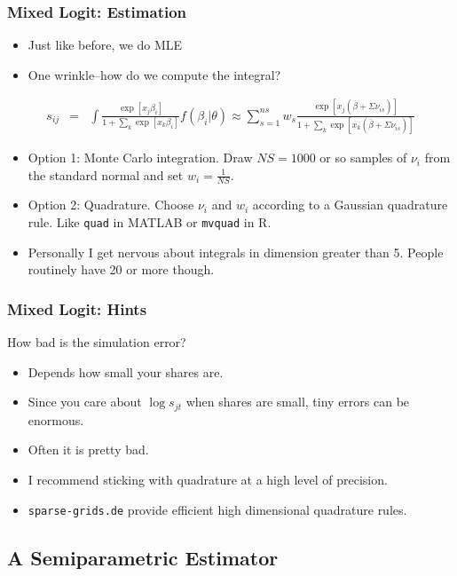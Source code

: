 \documentclass[xcolor=pdftex,dvipsnames,table,mathserif,aspectratio=169]{beamer}
\begin{document}
\begin{frame}
\frametitle{Mixed Logit: Estimation}
 \begin{itemize}
\item Just like before, we do MLE
\item One wrinkle--how do we compute the integral?
 \end{itemize}
\begin{eqnarray*}
s_{ij} &=& \int \frac{\exp[x_{j} \beta_i  ]}{1+\sum_k \exp[x_{k} \beta_i  ]} f(\beta_i | \theta) \approx \sum_{s=1}^{ns} w_s \frac{\exp[x_{j} (\overline{\beta} + \Sigma \nu_{is})  ]}{1+\sum_k \exp[x_{k} (\overline{\beta} + \Sigma \nu_{is})  ]} 
\end{eqnarray*}
 \begin{itemize}
\item Option 1: Monte Carlo integration.  Draw $NS=1000$ or so samples of $\nu_i$ from the standard normal and set $w_i = \frac{1}{NS}$.
\item Option 2: Quadrature. Choose $\nu_i$ and $w_i$ according to a Gaussian quadrature rule. Like \texttt{quad} in MATLAB or \texttt{mvquad} in R.
\item Personally I get nervous about integrals in dimension greater than 5. People routinely have 20 or more though.
 \end{itemize}
\end{frame}

\begin{frame}
\frametitle{Mixed Logit: Hints}
 How bad is the simulation error?
 \begin{itemize}
\item Depends how small your shares are. 
\item Since you care about $\log s_{jt}$ when shares are small, tiny errors can be enormous.
\item Often it is pretty bad.
\item I recommend sticking with quadrature at a high level of precision.
\item \texttt{sparse-grids.de} provide efficient high dimensional quadrature rules.
 \end{itemize}
\end{frame}

\subsection{A Semiparametric Estimator}
\end{document}
